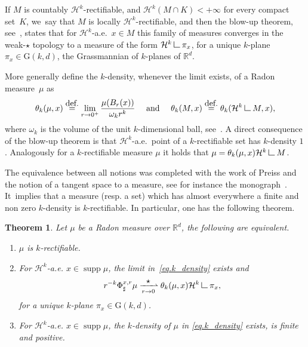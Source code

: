 \documentclass[11pt]{article}
\newcommand{\resp}{resp.\xspace}
\numberwithin{equation}{section}
\newenvironment{enumeratei}
{\bgroup\def\theenumi{\roman{enumi}}\def\theenumii{\arabic{enumii}}\begin{enumerate}}
{\end{enumerate}\egroup}
\let\ts\textstyle
\newtheorem{theorem}{Theorem}[section]
\theoremstyle{definition}
\newcommand{\eqdef}{\ensuremath{\stackrel{\mbox{\upshape\tiny def.}}{=}}}
\newcommand\LM[1]{\hbox{\vrule width.5pt \vbox to#1pt{\vfill \hrule width#1pt height.5pt}}}
\newcommand\LL{{\mathchoice {\>\LM7\>}{\>\LM7\>}{\,\LM5\,}{\,\LM{3.35}\,}}}
\newcommand{\mres}{\LL}
\newcommand\cH{\mathcal{H}}
\newcommand{\RR}{\mathbb{R}}
\DeclareMathOperator{\supp}{supp}
\begin{document}
If $M$ is countably $\cH^k$-rectifiable, and $\cH^k(M\cap K)<+\infty$ for every compact set~$K$, we~say that $M$ is locally $\cH^k$-rectifiable, and then the blow-up theorem, see~\cite[Th.\,10.2]{maggi2012sets}, states that for $\cH^k$-a.e.\ $x \in M$ this family of measures converges in the weak-$\star$ topology to a measure of the form $\cH^k \mres \pi_x$, for a unique $k$-plane $\pi_x \in \text{G}(k,d)$, the Grassmannian of $k$-planes of $\RR^d$.

More generally define the $k$-density, whenever the limit exists, of a Radon measure~$\mu$ as
\begin{equation}\label{eq.k_density}
\theta_k(\mu,x) \eqdef \lim_{r \to 0^+}
\frac{\mu(B_r(x))}{\omega_k r^k}\quad \text{ and }\quad
\theta_k(M,x) \eqdef \theta_k(\cH^k\mres M, x),
\end{equation}
where $\omega_k$ is the volume of the unit $k$-dimensional ball, see~\cite{ambrosio2000functions,maggi2012sets}. A direct consequence of the blow-up theorem is that $\cH^k$-a.e.~point of a $k$-rectifiable set has $k$-density $1$. Analogously for a $k$-rectifiable measure $\mu$ it holds that $\mu = \theta_k(\mu, x) \cH^k\mres M$.

The equivalence between all notions was completed with the work of Preiss and the notion of a tangent space to a measure, see for instance the monograph~\cite{delellis2006lecture}. It~implies that a measure (\resp a set) which has almost everywhere a finite and non zero $k$-density is $k$-rectifiable. In particular, one has the following theorem.

\begin{theorem}\label{theorem.rectifiability_tangentiability}
Let $\mu$ be a Radon measure over $\RR^d$, the following are equivalent.
\begin{enumeratei}
\item\label{theorem.rectifiability_tangentiabilityi}
$\mu$ is $k$-rectifiable.
\item\label{theorem.rectifiability_tangentiabilityii}
For $\cH^k$-a.e. $x \in \supp \mu$, the limit in~\eqref{eq.k_density} exists and
\[
r^{-k}\Phi^{x,r}_\sharp \mu \xrightharpoonup[r \to 0]{\ts\star} 
\theta_k(\mu,x)\cH^k\mres \pi_x,
\]
for a unique $k$-plane $\pi_x \in \text{G}(k,d)$.
\item\label{theorem.rectifiability_tangentiabilityiii}
For $\cH^k$-a.e. $x \in \supp \mu$, the $k$-density of $\mu$ in \eqref{eq.k_density} exists, is finite and positive.
\end{enumeratei}
\end{theorem}
\end{document}
